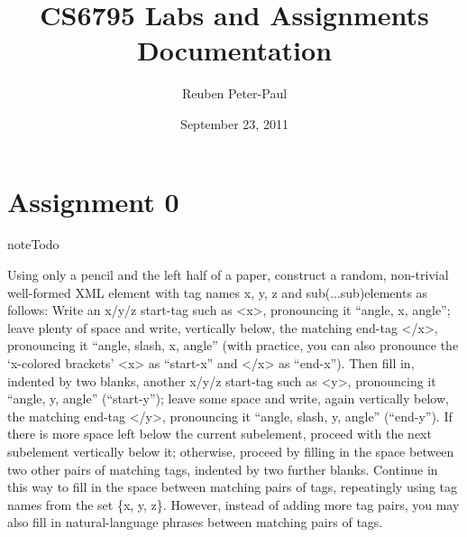 \documentclass[letterpaper,10pt,english]{sphinxmanual}
\title{CS6795 Labs and Assignments Documentation}
\date{September 23, 2011}
\author{Reuben Peter-Paul}
\begin{document}
\maketitle
\tableofcontents
{}\label{index::doc}



\chapter{Assignment 0}
\label{assign0:cs6795-labs-and-assignments}\label{assign0:assignment-0}\label{assign0::doc}
\begin{notice}{note}{Todo}

Using only a pencil and the left half of a paper, construct a random, non-trivial well-formed XML element with tag names x, y, z and sub(...sub)elements as follows: Write an x/y/z start-tag such as \textless{}x\textgreater{}, pronouncing it ``angle, x, angle''; leave plenty of space and write, vertically below, the matching end-tag \textless{}/x\textgreater{}, pronouncing it ``angle, slash, x, angle'' (with practice, you can also pronounce the `x-colored brackets' \textless{}x\textgreater{} as ``start-x'' and \textless{}/x\textgreater{} as ``end-x''). Then fill in, indented by two blanks, another x/y/z start-tag such as \textless{}y\textgreater{}, pronouncing it ``angle, y, angle'' (``start-y''); leave some space and write, again vertically below, the matching end-tag \textless{}/y\textgreater{}, pronouncing it ``angle, slash, y, angle'' (``end-y''). If there is more space left below the current subelement, proceed with the next subelement vertically below it; otherwise, proceed by filling in the space between two other pairs of matching tags, indented by two further blanks. Continue in this way to fill in the space between matching pairs of tags, repeatingly using tag names from the set \{x, y, z\}. However, instead of adding more tag pairs, you may also fill in natural-language phrases between matching pairs of tags.
\end{notice}
\end{document}
